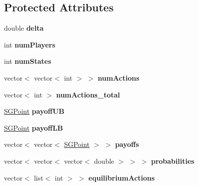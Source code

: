 \subsection*{Protected Attributes}
\begin{DoxyCompactItemize}
\item 
\hypertarget{class_s_g_game_a5031fc31f8009c19901c0930224e0465}{double {\bfseries delta}}\label{class_s_g_game_a5031fc31f8009c19901c0930224e0465}

\item 
\hypertarget{class_s_g_game_a6f02e3f92db6a3c5d2d9076dcb7b6d61}{int {\bfseries num\+Players}}\label{class_s_g_game_a6f02e3f92db6a3c5d2d9076dcb7b6d61}

\item 
\hypertarget{class_s_g_game_ae7b105b2fe9ee277d38e518223dd0482}{int {\bfseries num\+States}}\label{class_s_g_game_ae7b105b2fe9ee277d38e518223dd0482}

\item 
\hypertarget{class_s_g_game_acebe94d195ffb67f92925bcd4c26d1a9}{vector$<$ vector$<$ int $>$ $>$ {\bfseries num\+Actions}}\label{class_s_g_game_acebe94d195ffb67f92925bcd4c26d1a9}

\item 
\hypertarget{class_s_g_game_a3b219a37177b5b8b38737f570e419429}{vector$<$ int $>$ {\bfseries num\+Actions\+\_\+total}}\label{class_s_g_game_a3b219a37177b5b8b38737f570e419429}

\item 
\hypertarget{class_s_g_game_adddffb6486f549ed81e500bac6f082a0}{\hyperlink{class_s_g_point}{S\+G\+Point} {\bfseries payoff\+U\+B}}\label{class_s_g_game_adddffb6486f549ed81e500bac6f082a0}

\item 
\hypertarget{class_s_g_game_aa77243832314642979074af245c5f021}{\hyperlink{class_s_g_point}{S\+G\+Point} {\bfseries payoff\+L\+B}}\label{class_s_g_game_aa77243832314642979074af245c5f021}

\item 
\hypertarget{class_s_g_game_aad28dd39c6359e772286a938a948634c}{vector$<$ vector$<$ \hyperlink{class_s_g_point}{S\+G\+Point} $>$ $>$ {\bfseries payoffs}}\label{class_s_g_game_aad28dd39c6359e772286a938a948634c}

\item 
\hypertarget{class_s_g_game_a167a281b11d524cb4a11dbaff3e9de68}{vector$<$ vector$<$ vector$<$ double $>$ $>$ $>$ {\bfseries probabilities}}\label{class_s_g_game_a167a281b11d524cb4a11dbaff3e9de68}

\item 
\hypertarget{class_s_g_game_a11a623e3119e5aabb06181870bf5dcd7}{vector$<$ list$<$ int $>$ $>$ {\bfseries equilibrium\+Actions}}\label{class_s_g_game_a11a623e3119e5aabb06181870bf5dcd7}

\end{DoxyCompactItemize}
